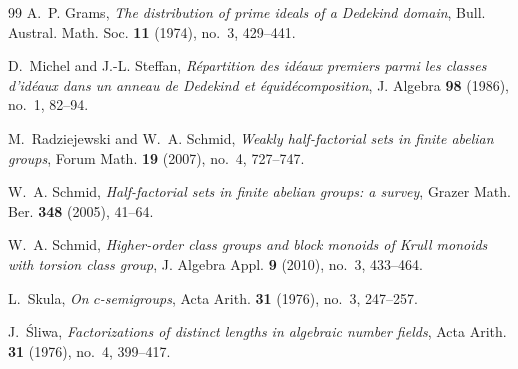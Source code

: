 \documentclass[11pt,reqno]{amsart}
\numberwithin{equation}{section}
\theoremstyle{definition}
\theoremstyle{remark}
\begin{document}
\begin{thebibliography}{99}
A.~P. Grams,
\emph{The distribution of prime ideals of a Dedekind domain},
Bull. Austral. Math. Soc. \textbf{11} (1974), no.~3, 429--441.

D.~Michel and J.-L. Steffan,
\emph{R\'epartition des id\'eaux premiers parmi les classes d'id\'eaux
dans un anneau de Dedekind et \'equid\'ecomposition},
J. Algebra \textbf{98} (1986), no.~1, 82--94.

M.~Radziejewski and W.~A. Schmid,
\emph{Weakly half-factorial sets in finite abelian groups},
Forum Math. \textbf{19} (2007), no.~4, 727--747.

W.~A. Schmid,
\emph{Half-factorial sets in finite abelian groups: a survey},
Grazer Math. Ber. \textbf{348} (2005), 41--64.

W.~A. Schmid,
\emph{Higher-order class groups and block monoids of Krull monoids
with torsion class group},
J. Algebra Appl. \textbf{9} (2010), no.~3, 433--464.

L.~Skula,
\emph{On $c$-semigroups},
Acta Arith. \textbf{31} (1976), no.~3, 247--257.

J.~\'{S}liwa,
\emph{Factorizations of distinct lengths in algebraic number fields},
Acta Arith. \textbf{31} (1976), no.~4, 399--417.

\end{thebibliography}
\end{document}

